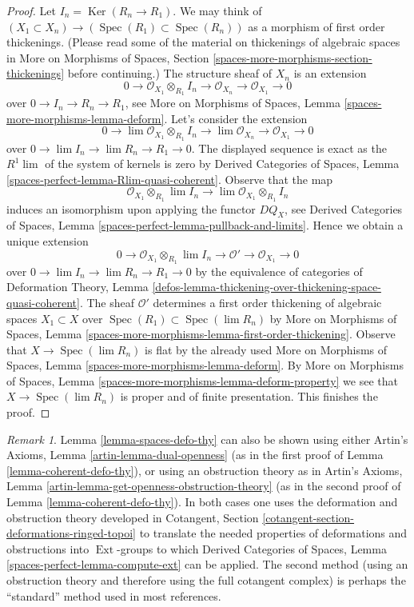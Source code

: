 \documentclass{stacks-project}
\theoremstyle{plain}
\theoremstyle{definition}
\theoremstyle{remark}
\newtheorem{remark}[subsection]{Remark}
\numberwithin{equation}{subsection}
\def\lim{\mathop{\mathrm{lim}}\nolimits}
\def\Spec{\mathop{\mathrm{Spec}}}
\def\Ext{\mathop{\mathrm{Ext}}\nolimits}
\def\Ker{\mathop{\mathrm{Ker}}}
\begin{document}
\begin{proof}
\medskip\noindent
Let $I_n = \Ker(R_n \to R_1)$. We may think of
$(X_1 \subset X_n) \to (\Spec(R_1) \subset \Spec(R_n))$
as a morphism of first order thickenings. (Please read some of the material
on thickenings of algebraic spaces in More on Morphisms of Spaces, Section
\ref{spaces-more-morphisms-section-thickenings}
before continuing.) The structure sheaf of $X_n$ is an extension
$$
0 \to \mathcal{O}_{X_1} \otimes_{R_1} I_n \to
\mathcal{O}_{X_n} \to \mathcal{O}_{X_1} \to 0
$$
over $0 \to I_n \to R_n \to R_1$, see
More on Morphisms of Spaces, Lemma
\ref{spaces-more-morphisms-lemma-deform}.
Let's consider the extension
$$
0 \to \lim \mathcal{O}_{X_1} \otimes_{R_1} I_n \to
\lim \mathcal{O}_{X_n} \to \mathcal{O}_{X_1} \to 0
$$
over $0 \to \lim I_n \to \lim R_n \to R_1 \to 0$.
The displayed sequence is exact as the $R^1\lim$ of the system
of kernels is zero by Derived Categories of Spaces, Lemma
\ref{spaces-perfect-lemma-Rlim-quasi-coherent}.
Observe that the map
$$
\mathcal{O}_{X_1} \otimes_{R_1} \lim I_n \longrightarrow
\lim \mathcal{O}_{X_1} \otimes_{R_1} I_n
$$
induces an isomorphism upon applying the functor $DQ_X$, see
Derived Categories of Spaces, Lemma
\ref{spaces-perfect-lemma-pullback-and-limits}.
Hence we obtain a unique extension
$$
0 \to \mathcal{O}_{X_1} \otimes_{R_1} \lim I_n \to
\mathcal{O}' \to \mathcal{O}_{X_1} \to 0
$$
over $0 \to \lim I_n \to \lim R_n \to R_1 \to 0$
by the equivalence of categories of
Deformation Theory, Lemma
\ref{defos-lemma-thickening-over-thickening-space-quasi-coherent}.
The sheaf $\mathcal{O}'$ determines
a first order thickening of algebraic spaces $X_1 \subset X$
over $\Spec(R_1) \subset \Spec(\lim R_n)$
by More on Morphisms of Spaces, Lemma
\ref{spaces-more-morphisms-lemma-first-order-thickening}.
Observe that $X \to \Spec(\lim R_n)$ is flat by the already
used More on Morphisms of Spaces, Lemma
\ref{spaces-more-morphisms-lemma-deform}.
By More on Morphisms of Spaces, Lemma
\ref{spaces-more-morphisms-lemma-deform-property}
we see that $X \to \Spec(\lim R_n)$ is proper
and of finite presentation.
This finishes the proof.
\end{proof}

\begin{remark}
\label{remark-spaces-defo-thy}
Lemma \ref{lemma-spaces-defo-thy} can also be shown using either
Artin's Axioms, Lemma \ref{artin-lemma-dual-openness}
(as in the first proof of
Lemma \ref{lemma-coherent-defo-thy}), or using an obstruction theory
as in Artin's Axioms, Lemma \ref{artin-lemma-get-openness-obstruction-theory}
(as in the second proof of
Lemma \ref{lemma-coherent-defo-thy}).
In both cases one uses the deformation and obstruction theory developed in
Cotangent, Section \ref{cotangent-section-deformations-ringed-topoi}
to translate the needed properties of deformations and obstructions
into $\Ext$-groups to which
Derived Categories of Spaces, Lemma
\ref{spaces-perfect-lemma-compute-ext}
can be applied.
The second method (using an obstruction theory and therefore
using the full cotangent complex) is perhaps the ``standard'' method used
in most references.
\end{remark}
\end{document}
